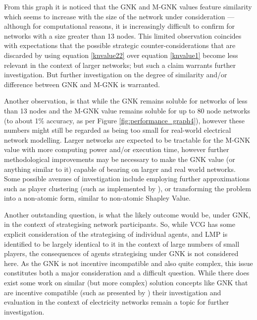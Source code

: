 From this graph it is noticed that the GNK and M-GNK values feature similarity which seems to increase with the size of the network under consideration --- although for computational reasons, it is increasingly difficult to confirm for networks with a size greater than 13 nodes.
This limited observation coincides with expectations that the possible strategic counter-considerations that are discarded by using equation \ref{knvalue22} over equation \ref{knvalue1} become less relevant in the context of larger networks; but such a claim warrants further investigation.
But further investigation on the degree of similarity and/or difference between GNK and M-GNK is warranted.

Another observation, is that while the GNK remains soluble for networks of less than 13 nodes and the M-GNK value remains soluble for up to 80 node networks (to about 1\% accuracy, as per Figure \ref{fig:performance_graph4}), however these numbers might still be regarded as being too small for real-world electrical network modelling.
Larger networks are expected to be tractable for the M-GNK value with more computing power and/or execution time, however further methodological improvements may be necessary to make the GNK value (or anything similar to it) capable of bearing on larger and real world networks.
Some possible avenues of investigation include employing further approximations such as player clustering (such as implemented by \cite{DBLP:journals/corr/abs-1903-10965}), or transforming the problem into a non-atomic form, similar to non-atomic Shapley Value.

Another outstanding question, is what the likely outcome would be, under GNK, in the context of strategising network participants.
So, while VCG has some explicit consideration of the strategising of individual agents, and LMP is identified to be largely identical to it in the context of large numbers of small players, the consequences of agents strategising under GNK is not considered here.
As the GNK is not incentive incompatible and also quite complex, this issue constitutes both a major consideration and a difficult question.
While there does exist some work on similar (but more complex) solution concepts like GNK that are incentive compatible (such as presented by \cite{myerson1,Salamanca2019}) their investigation and evaluation in the context of electricity networks remain a topic for further investigation.

